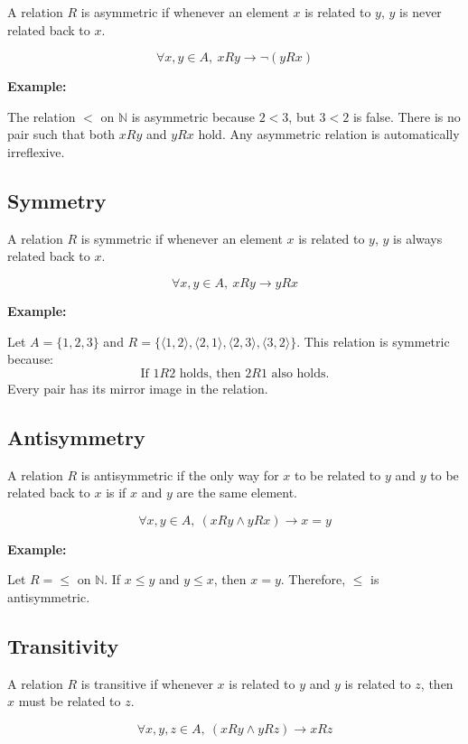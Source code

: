 \documentclass[12pt,a4paper,openany]{article}
\begin{document}
A relation $R$ is asymmetric if whenever an element $x$ is related to $y$, $y$ is never related back to $x$.

$$\forall x,y \in A,\ xRy \to \neg(yRx)$$

\textbf{Example:}

The relation $<$ on $\mathbb{N}$ is asymmetric because $2 < 3$, but $3 < 2$ is false. There is no pair such that both $xRy$ and $yRx$ hold. Any asymmetric relation is automatically irreflexive.

\subsection{Symmetry}\label{symmetry}

A relation $R$ is symmetric if whenever an element $x$ is related to $y$, $y$ is always related back to $x$.

$$\forall x,y \in A, \ xRy \to yRx$$

\textbf{Example:}

Let $A = \{1,2,3\}$ and $R = \{\langle 1,2 \rangle, \langle 2,1 \rangle, \langle 2,3 \rangle, \langle 3,2 \rangle\}$. This relation is symmetric because:
$$\text{If } 1R2 \text{ holds, then } 2R1 \text{ also holds.}$$
Every pair has its mirror image in the relation.

\subsection{Antisymmetry}\label{antisymmetry}

A relation $R$ is antisymmetric if the only way for $x$ to be related to $y$ and $y$ to be related back to $x$ is if $x$ and $y$ are the same element.

$$\forall x,y \in A,\ (xRy \land yRx) \to x = y$$

\textbf{Example:}

Let $R = \leq$ on $\mathbb{N}$. If $x \leq y$ and $y \leq x$, then $x = y$. Therefore, $\leq$ is antisymmetric.

\subsection{Transitivity}\label{transitivity}

A relation $R$ is transitive if whenever $x$ is related to $y$ and $y$ is related to $z$, then $x$ must be related to $z$.

$$\forall x,y,z \in A,\ (xRy \land yRz) \to xRz$$
\end{document}
